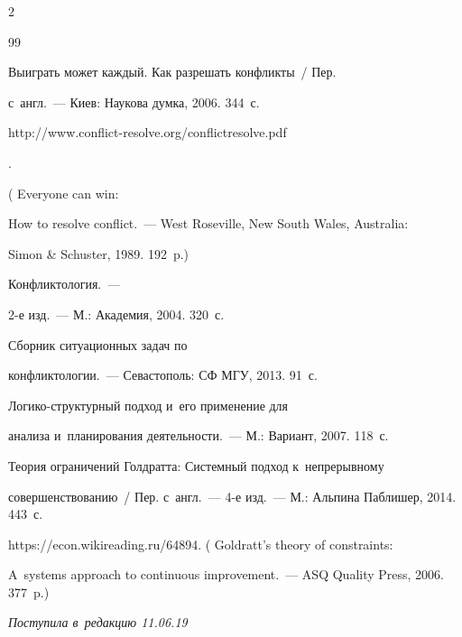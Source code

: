 \begin{multicols}{2}
{{\begin{thebibliography}{99}

 Выиграть может каждый. Как разрешать конфликты~/ Пер. 

с~англ.~--- Киев: Наукова думка, 2006. 344~с. {\sf  

http://www.conflict-resolve.org/conflictresolve.pdf}.

( Everyone can win: 

How to resolve conflict.~--- West Roseville, New South Wales, Australia: 

Simon \& Schuster, 1989. 192~p.)


 Конфликтология.~--- 

2-е изд.~--- М.: Академия, 2004. 320~с.


 Сборник ситуационных задач по 

конфликтологии.~--- Севастополь: СФ МГУ, 2013. 91~с.


 Ло\-ги\-ко-струк\-тур\-ный подход и~его применение для 

анализа и~планирования деятельности.~--- М.: Вариант, 2007. 118~с. 


 Теория ограничений Голдратта: Системный подход к~непрерывному 

совершенствованию~/ Пер. с~англ.~--- 4-е изд.~--- М.: Альпина Паблишер, 2014. 443~с. 

{\sf https://econ.wikireading.ru/64894}. ( Goldratt's theory of constraints: 

A~systems approach to continuous improvement.~--- ASQ Quality Press, 2006. 377~p.) 



 \end{thebibliography}



 }

 }



\end{multicols}



\vspace*{-6pt}



\hfill{\small\textit{Поступила в~редакцию 11.06.19}}



